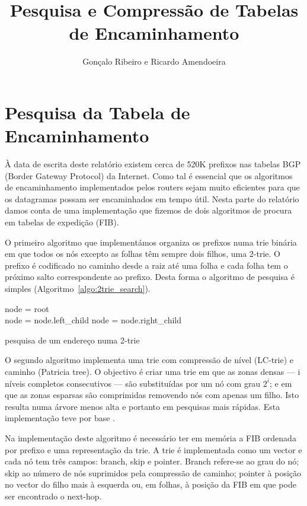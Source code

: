 \documentclass[10pt,a4paper]{article}
\author{Gonçalo Ribeiro e Ricardo Amendoeira}
\title{Pesquisa e Compressão de Tabelas de Encaminhamento}
\begin{document}
\maketitle
\section{Pesquisa da Tabela de Encaminhamento}
	À data de escrita deste relatório existem cerca de 520K prefixos nas tabelas BGP (Border Gateway Protocol) da Internet. Como tal é essencial que os algoritmos de encaminhamento implementados pelos routers sejam muito eficientes para que os datagramas possam ser encaminhados em tempo útil. Nesta parte do relatório damos conta de uma implementação que fizemos de dois algoritmos de procura em tabelas de expedição (FIB).

	O primeiro algoritmo que implementámos organiza os prefixos numa trie binária em que todos os nós excepto as folhas têm sempre dois filhos, uma \mbox{2-trie}. O prefixo é codificado no caminho desde a raiz até uma folha e cada folha tem o próximo salto correspondente ao prefixo. Desta forma o algoritmo de pesquisa é simples (Algoritmo~\ref{algo:2trie_search}).

\begin{algorithm}
	\label{algo:2trie_search}
	node = root\\
	{
		{
			{
				node = node.left\_child
			}
			\uElse
			{
				node = node.right\_child
			}
		}
		\uElse
		{
		}
	}
		\begin{comment}
			node = root
			for each bit in address, starting at MSB
				if node != leaf
					if bit == 0
						go to left child
					else
						go to right child
				else
					return node.interface
		\end{comment}
	\caption{pesquisa de um endereço numa 2-trie}
\end{algorithm}

	O segundo algoritmo implementa uma trie com compressão de nível (\mbox{LC-trie}) e caminho (Patricia tree). O objectivo é criar uma trie em que as zonas densas --- i níveis completos consecutivos --- são substituídas por um nó com grau $2^i$; e em que as zonas esparsas são comprimidas removendo nós com apenas um filho. Isto resulta numa árvore menos alta e portanto em pesquisas mais rápidas. Esta implementação teve por base \cite{SNilsson99}.

Na implementação deste algoritmo é necessário ter em memória a FIB ordenada por prefixo e uma representação da trie. A trie é implementada como um vector e cada nó tem três campos: branch, skip e pointer. Branch refere-se ao grau do nó; skip ao número de nós suprimidos pela compressão de caminho; pointer à posição no vector do filho mais à esquerda ou, em folhas, à posição da FIB em que pode ser encontrado o next-hop.
\end{document}
